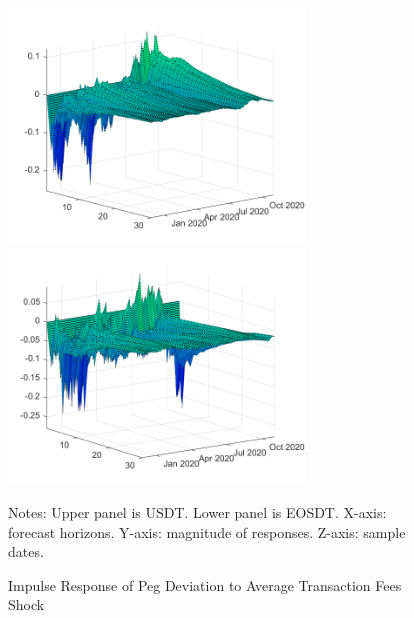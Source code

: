 \documentclass[12pt]{article}
\begin{document}
\begin{figure}
	\centering
	\caption{Impulse Response of Peg Deviation to Average Transaction Fees Shock}
	\includegraphics[width=0.7\textwidth]{shock1resp3}
	\includegraphics[width=0.7\textwidth]{shock1resp3eos}
	\label{shock13}
	\begin{minipage}{1\textwidth} %
		{\footnotesize Notes: Upper panel is USDT. Lower panel is EOSDT. X-axis: forecast horizons. Y-axis: magnitude of responses. Z-axis: sample dates. \par}
	\end{minipage}
\end{figure}
\end{document}
